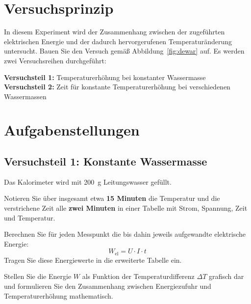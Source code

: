 \documentclass[11pt,a4paper]{scrartcl}
\begin{document}
	\section*{Versuchsprinzip}
	
	In diesem Experiment wird der Zusammenhang zwischen der zugeführten elektrischen Energie und der dadurch hervorgerufenen Temperaturänderung untersucht. Bauen Sie den Versuch gemäß Abbildung~\ref{fig:dewar} auf. Es werden zwei Versuchsreihen durchgeführt:
	
	\textbf{Versuchsteil 1:} Temperaturerhöhung bei konstanter Wassermasse\\
	\textbf{Versuchsteil 2:} Zeit für konstante Temperaturerhöhung bei verschiedenen Wassermassen
	
	\section*{Aufgabenstellungen}
	
	\subsection*{Versuchsteil 1: Konstante Wassermasse}
	
	Das Kalorimeter wird mit \SI{200}{\gram} Leitungswasser gefüllt.
	
	\begin{aufgabe}[title={\faIcon{pencil-alt} Aufgabe 1.1: Messung}]
		Notieren Sie über insgesamt etwa \textbf{15 Minuten} die Temperatur und die verstrichene Zeit alle \textbf{zwei Minuten} in einer Tabelle mit Strom, Spannung, Zeit und Temperatur.
	\end{aufgabe}
	
	\begin{aufgabe}[title={\faIcon{pencil-alt} Aufgabe 1.2: Berechnung}]
		Berechnen Sie für jeden Messpunkt die bis dahin jeweils aufgewandte elektrische Energie:
		\[W_{\text{el}} = U \cdot I \cdot t\]
		Tragen Sie diese Energiewerte in die erweiterte Tabelle ein.
	\end{aufgabe}
	
	\begin{aufgabe}[title={\faIcon{pencil-alt} Aufgabe 1.3: Grafische Darstellung}]
		Stellen Sie die Energie $W$ als Funktion der Temperaturdifferenz $\Delta T$ grafisch dar und formulieren Sie den Zusammenhang zwischen Energiezufuhr und Temperaturerhöhung mathematisch.
	\end{aufgabe}
	
\end{document}
